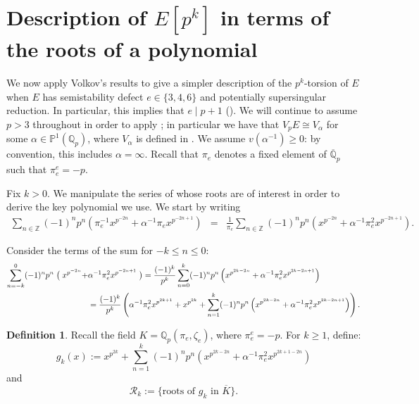 \documentclass{amsart}
\newcommand{\Qp}{\mathbb{Q}_p}
\theoremstyle{definition}
\newtheorem{definition}[theorem]{Definition}
\newcommand{\Z}{\mathbb{Z}}
\newcommand{\Q}{\mathbb{Q}}
\numberwithin{theorem}{section}
\numberwithin{equation}{section}
\begin{document}
\section{Description of $E[p^k]$ in terms of the roots of a polynomial}\label{sect: description of p2 torsion}

We now apply Volkov's results to give a simpler description of the $p^k$-torsion of $E$ when $E$ has semistability defect $e \in \{3,4,6\}$ and potentially supersingular reduction. In particular, this implies that $e \mid p+1$ (). We will continue to assume $p>3$ throughout in order to apply ; in particular we have that $V_pE \cong V_{\alpha}$ for some $\alpha \in \mathbb{P}^1(\Qp)$, where $V_\alpha$ is defined in . We assume $v(\alpha^{-1}) \geq 0$: by convention, this includes $\alpha=\infty$. Recall that $\pi_e$ denotes a fixed element of $\overline{\Q}_p$ such that $\pi_e^e=-p$.


Fix $k>0$. We manipulate the series of  whose roots are of interest in order to derive the key polynomial we use. We start by writing
\begin{eqnarray*}
\sum_{n \in \Z} (-1)^np^n \left( \pi_e^{-1}x^{p^{-2n}} + \alpha^{-1}\pi_ex^{p^{-2n+1}} \right) &=& \frac{1}{\pi_e} \sum_{n \in \Z} (-1)^np^n \left( x^{p^{-2n}} + \alpha^{-1}\pi_e^2x^{p^{-2n+1}} \right).
\end{eqnarray*}

Consider the terms of the sum for $-k \leq n \leq 0$:
\[
\begin{aligned}
\sum_{n=-k}^{0} (-1)^np^n \bigm( x^{p^{-2n}} +  & \alpha^{-1}\pi_e^2x^{p^{-2n+1}} \bigm) 
\; = \frac{(-1)^k}{p^k} \sum_{n=0}^{k} (-1)^{n}p^{n} \left( x^{p^{2k-2n}} + \alpha^{-1}\pi_e^2x^{p^{2k-2n+1}} \right) \\
&= \frac{(-1)^k}{p^k} \left( \alpha^{-1}\pi_e^2x^{p^{2k+1}} + x^{p^{2k}} + \sum_{n=1}^{k} (-1)^{n}p^{n} \left( x^{p^{2k-2n}} + \alpha^{-1}\pi_e^2x^{p^{2k-2n+1}} \right) \right).
\end{aligned}
\]

\begin{definition}
Recall the field $K=\Q_p(\pi_e, \zeta_e)$, where $\pi_e^e =-p$. For $k \geq 1$, define:
\begin{equation}\label{eq: polynomial g}
    g_k(x) := x^{p^{2k}}+ \sum_{n=1}^{k} (-1)^np^n (x^{p^{2k-2n}} + \alpha^{-1}\pi_e^2x^{p^{2k+1-2n}})
\end{equation}
and
\[
\mathcal{R}_k := \{ \text{roots of } g_k \text{ in } \overline{K}\}.
\]
\end{definition}
\end{document}
